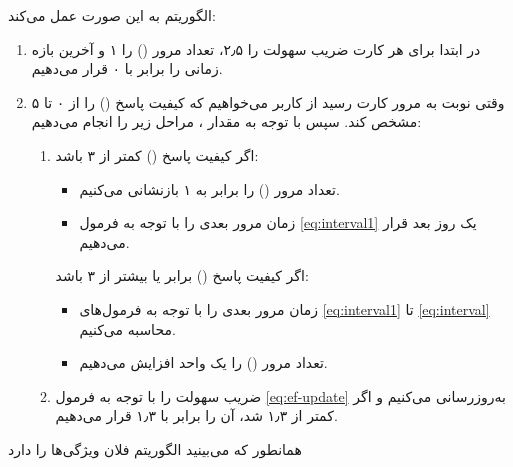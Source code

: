 \documentclass[12pt]{report}
\begin{document}
الگوریتم به این صورت عمل می‌کند:
\begin{enumerate}
    \item در ابتدا برای هر کارت ضریب سهولت را ۲٫۵، تعداد مرور
    () را ۱ و آخرین بازه زمانی را برابر با ۰ قرار می‌دهیم.
    \item وقتی نوبت به مرور کارت رسید از کاربر می‌خواهیم که کیفیت پاسخ
    () را از ۰ تا ۵ مشخص کند. سپس با توجه به مقدار ، مراحل زیر را انجام می‌دهیم:
    \begin{enumerate}
        \item اگر کیفیت پاسخ
        () کمتر از ۳ باشد:
        \begin{itemize}
            \item تعداد مرور
            () را برابر به ۱ بازنشانی می‌کنیم.
            \item زمان مرور بعدی را
             با توجه به فرمول \ref{eq:interval1}
            یک روز بعد قرار می‌دهیم.
        \end{itemize}
        اگر کیفیت پاسخ
        () برابر یا بیشتر از ۳ باشد:
        \begin{itemize}
            \item زمان مرور بعدی را با توجه به فرمول‌های
            \ref{eq:interval1} تا \ref{eq:interval}
            محاسبه می‌کنیم.
            \item تعداد مرور
            () را یک واحد افزایش می‌دهیم.
        \end{itemize}
        \item ضریب سهولت را
        با توجه به فرمول \ref{eq:ef-update}
        به‌روزرسانی می‌کنیم و اگر کمتر از ۱٫۳ شد، آن را برابر با ۱٫۳ قرار می‌دهیم.
    \end{enumerate}
\end{enumerate}

همانطور که می‌بینید الگوریتم فلان ویژگی‌ها را دارد
\end{document}
